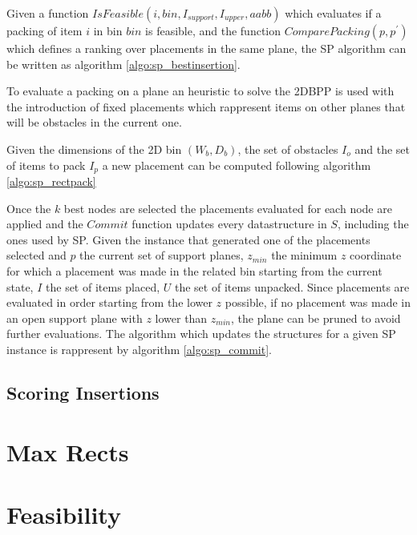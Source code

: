Given a function $IsFeasible(i, bin, I_{support}, I_{upper}, aabb)$ which evaluates if a packing of item $i$ in bin $bin$ is feasible,
and the function $ComparePacking(p, p^\prime)$ which defines a ranking over placements in the same plane,
the SP algorithm can be written as algorithm \ref{algo:sp_bestinsertion}.



To evaluate a packing on a plane an heuristic to solve the 2DBPP is used with the introduction of fixed placements which rappresent items on other planes that will be obstacles in the current one.


Given the dimensions of the 2D bin $(W_b, D_b)$, the set of obstacles $I_{o}$ and the set of items to pack $I_{p}$ a new placement can be computed following algorithm \ref{algo:sp_rectpack}



Once the $k$ best nodes are selected the placements evaluated for each node are applied and the $Commit$ function updates every datastructure in $S$, including the ones used by SP.
Given the instance that generated one of the placements selected and $p$ the current set of support planes, $z_{min}$ the minimum $z$ coordinate for which a placement was made in the related bin starting from the current state, $I$ the set of items placed, $U$ the set of items unpacked.
Since placements are evaluated in order starting from the lower $z$ possible, if no placement was made in an open support plane with $z$ lower than $z_{min}$, the plane can be pruned to avoid further evaluations.
The algorithm which updates the structures for a given SP instance is rappresent by algorithm \ref{algo:sp_commit}.



\subsection{Scoring Insertions}

\section{Max Rects}\label{chapter:heuristics:maxrects}

\section{Feasibility}\label{chapter:heuristics:feasibility}


